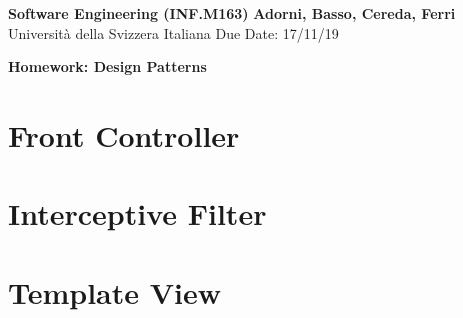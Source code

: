\documentclass[12pt]{article}
\begin{document}

\textbf{Software Engineering (INF.M163)} \hfill \textbf{Adorni, Basso, Cereda, Ferri} \\
\normalsize Università della Svizzera Italiana \hfill Due Date: 17/11/19 \\

\begin{center}
\textbf{Homework: Design Patterns}
\end{center}

\section{Front Controller}

\section{Interceptive Filter}

\section{Template View}
\end{document}
